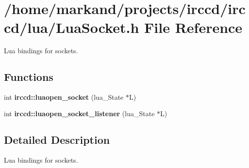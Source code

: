 \hypertarget{a00113}{\section{/home/markand/projects/irccd/irccd/lua/\-Lua\-Socket.h File Reference}
\label{a00113}
}


Lua bindings for sockets.  


\subsection*{Functions}
\begin{DoxyCompactItemize}
\item 
int {\bfseries irccd\-::luaopen\-\_\-socket} (lua\-\_\-\-State $\ast$L)
\item 
int {\bfseries irccd\-::luaopen\-\_\-socket\-\_\-listener} (lua\-\_\-\-State $\ast$L)
\end{DoxyCompactItemize}


\subsection{Detailed Description}
Lua bindings for sockets. 